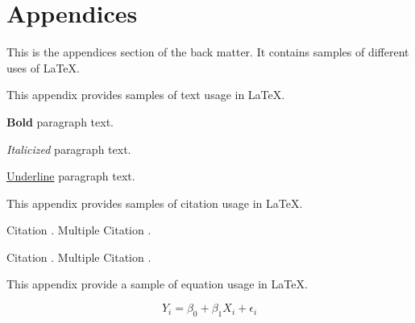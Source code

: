 

\appendix
\chapter*{Appendices} \label{appendices}

\renewcommand\thefigure{\theappendices.\arabic{figure}}
\renewcommand\thetable{\theappendices.\arabic{table}}

\setcounter{figure}{0}
\setcounter{table}{0}

This is the appendices section of the back matter. It contains samples of different uses of LaTeX.


 \label{text}

This appendix provides samples of text usage in LaTeX.

 \label{bold-text}

\textbf{Bold} paragraph text.

 \label{italicized-text}

\textit{Italicized} paragraph text.

 \label{underlined-text}

\underline{Underline} paragraph text.


 \label{citations}

This appendix provides samples of citation usage in LaTeX.

 \label{bracket-citations}

Citation \citep{lastnamep:yearp}. Multiple Citation \citep{lastnamep:yearp,lastnamee:yeare,lastnamea:yeara}.

 \label{direct-citations}

Citation \citet{lastnamep:yearp}. Multiple Citation \citet{lastnamep:yearp,lastnamee:yeare,lastnamea:yeara}.


 \label{equations}

This appendix provide a sample of equation usage in LaTeX.

\begin{equation}
\label{eq:1}
	Y_i = \beta_0 + \beta_1 X_i + \epsilon_i
\end{equation}

